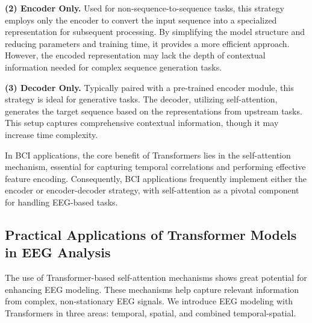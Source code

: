 \documentclass[preprint,12pt]{elsarticle}
\begin{document}
\textbf{(2) Encoder Only.} Used for non-sequence-to-sequence tasks, this strategy employs only the encoder to convert the input sequence into a specialized representation for subsequent processing. By simplifying the model structure and reducing parameters and training time, it provides a more efficient approach. However, the encoded representation may lack the depth of contextual information needed for complex sequence generation tasks.

\textbf{(3) Decoder Only.} Typically paired with a pre-trained encoder module, this strategy is ideal for generative tasks. The decoder, utilizing self-attention, generates the target sequence based on the representations from upstream tasks. This setup captures comprehensive contextual information, though it may increase time complexity.

In BCI applications, the core benefit of Transformers lies in the self-attention mechanism, essential for capturing temporal correlations and performing effective feature encoding. Consequently, BCI applications frequently implement either the encoder or encoder-decoder strategy, with self-attention as a pivotal component for handling EEG-based tasks.

\subsection{Practical Applications of Transformer Models in EEG Analysis}
The use of Transformer-based self-attention mechanisms shows great potential for enhancing EEG modeling. These mechanisms help capture relevant information from complex, non-stationary EEG signals. We introduce EEG modeling with Transformers in three areas: temporal, spatial, and combined temporal-spatial.
\end{document}

